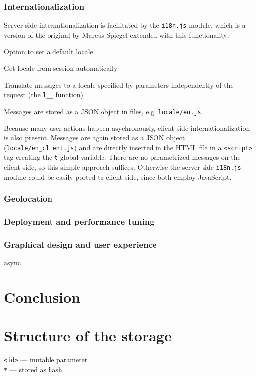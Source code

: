 \documentclass[12pt,oneside]{fithesis}
\begin{document}
	\subsection{Internationalization}
		Server-side internationalization is facilitated by the \texttt{i18n.js} module, which is a version of the original by Marcus Spiegel extended with this functionality:
		\begin{compactitem}
			\item Option to set a default locale
			\item Get locale from session automatically
			\item Translate messages to a locale specified by parameters independently of the request (the \texttt{l\_\_} function)
		\end{compactitem}
		Messages are stored as a JSON object in files, e.g. \texttt{locale/en.js}.
		
		Because many user actions happen asychronously, client-side internationalization is also present. Messages are again stored as a JSON object (\texttt{locale/en\_client.js}) and are directly inserted in the HTML file in a \texttt{<script>} tag creating the \texttt{t} global variable. There are no parametrized messages on the client side, so this simple approach suffices. Otherwise the server-side \texttt{i18n.js} module could be easily ported to client side, since both employ JavaScript.
	\subsection{Geolocation}
	\label{section:geo}
		
	\subsection{Deployment and performance tuning}
	\subsection{Graphical design and user experience}
	async
\chapter{Conclusion}

\appendix
\chapter{Structure of the storage}
\label{appendix:scheme}
\texttt{<id>} --- mutable parameter\\
\texttt{*} --- stored as hash
\inputminted[fontsize=\footnotesize]{yaml}{scheme.txt}


\end{document}
